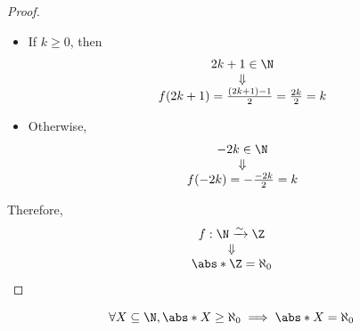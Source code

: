 \begin{proof}
\begin{itemize}
\begin{itemize}
            \item If $k \geq 0$, then
                  \[
                    \begin{array}{c}
                      2k + 1 \in \N \\
                      \Downarrow    \\
                      f(2k + 1) = \frac{(2k + 1) - 1}{2} = \frac{2k}{2} = k
                    \end{array}
                  \]
            \item Otherwise,
                  \[
                    \begin{array}{c}
                      -2k \in \N \\
                      \Downarrow \\
                      f(-2k) = - \frac{-2k}{2} = k
                    \end{array}
                  \]
          \end{itemize}
  \end{itemize}
  Therefore,
  \[
    \begin{array}{c}
      f: \N \xrightarrow{\sim} \Z \\
      \Downarrow                  \\
      \abs*{\Z} = \aleph_{0}
    \end{array}
  \]
\end{proof}

\begin{lemma} \label{an1:lem:infinite-subset-of-N-is-countable}
  \[
    \forall X \subseteq \N, \abs*{X} \geq \aleph_{0} \implies \abs*{X} = \aleph_{0}
  \]
\end{lemma}

